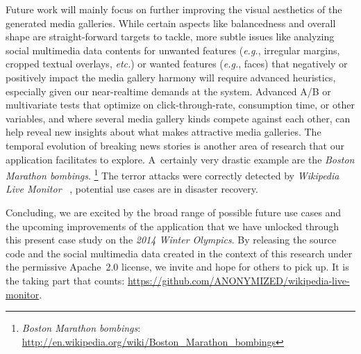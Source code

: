\documentclass{sig-alternate}
\newcommand{\inlinelistingsize}{\fontsize{8pt}{11pt}}
\let\oldurl\url
\renewcommand{\url}[1]{\inlinelistingsize\oldurl{#1}}
\begin{document}
Future work will mainly focus on further improving the visual aesthetics
of the generated media galleries.
While certain aspects like balancedness and overall shape
are straight-forward targets to tackle,
more subtle issues like analyzing social multimedia data contents
for unwanted features (\emph{e.g.}, irregular margins,
cropped textual overlays, \emph{etc.})
or wanted features (\emph{e.g.}, faces)
that negatively or positively impact the media gallery harmony
will require advanced heuristics,
especially given our near-realtime demands at the system.
Advanced A/B or multivariate tests that optimize on click-through-rate,
consumption time, or other variables,
and where several media gallery kinds compete against each other,
can help reveal new insights about what makes attractive media galleries.
The temporal evolution of breaking news stories is
another area of research that our application facilitates to explore.
A~certainly very drastic example are the \emph{Boston Marathon bombings}.%
\footnote{\emph{Boston Marathon bombings}:
\url{http://en.wikipedia.org/wiki/Boston_Marathon_bombings}}
The terror attacks were correctly detected by \emph{Wikipedia Live Monitor}%
~\cite{bea2013wikilivemon}, potential use cases are in disaster recovery.

Concluding, we are excited by the broad range
of possible future use cases
and the upcoming improvements of the application
that we have unlocked through this present case study
on the \emph{2014 Winter Olympics}.
By releasing the source code and the social multimedia data 
created in the context of this research under the permissive
Apache~2.0 license, we invite and hope for others to pick up.
It is the taking part that counts:
\url{https://github.com/ANONYMIZED/wikipedia-live-monitor}.
\end{document}
